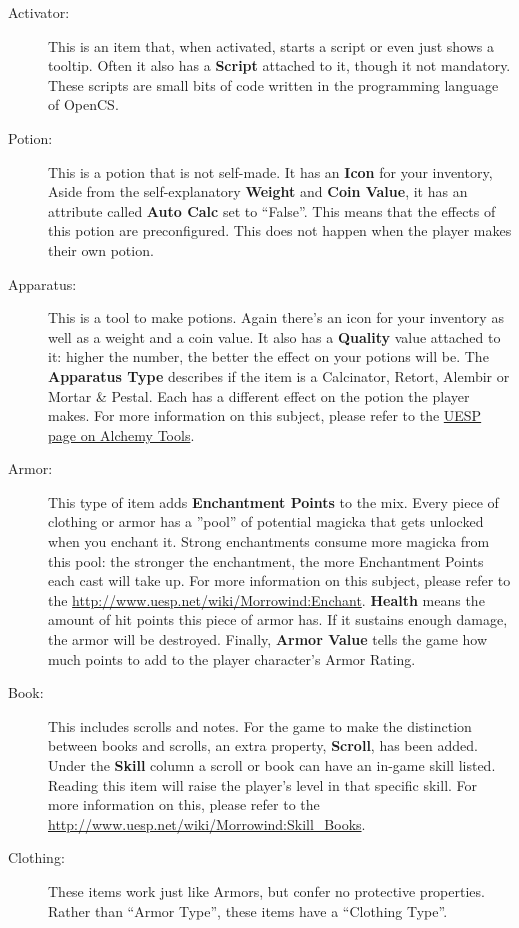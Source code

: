 \begin{description}
 \item[Activator:] This is an item that, when activated, starts a script or even just shows a tooltip. Often it also has a \textbf{Script} attached to it, though it not mandatory. These scripts are small bits of code written in the programming language of OpenCS.
 \item[Potion:] This is a potion that is not self-made. It has an \textbf{Icon} for your inventory, Aside from the self-explanatory \textbf{Weight} and \textbf{Coin Value}, it has an attribute called \textbf{Auto Calc} set to ``False''. This means that the effects of this potion are preconfigured. This does not happen when the player makes their own potion.
 \item[Apparatus:] This is a tool to make potions. Again there's an icon for your inventory as well as a weight and a coin value. It also has a \textbf{Quality} value attached to it: higher the number, the better the effect on your potions will be. The \textbf{Apparatus Type} describes if the item is a Calcinator, Retort, Alembir or Mortar & Pestal. Each has a different effect on the potion the player makes. For more information on this subject, please refer to the \href{http://www.uesp.net/wiki/Morrowind:Alchemy#Tools}{UESP page on Alchemy Tools}.
 \item[Armor:] This type of item adds \textbf{Enchantment Points} to the mix. Every piece of clothing or armor has a ''pool'' of potential magicka that gets unlocked when you enchant it. Strong enchantments consume more magicka from this pool: the stronger the enchantment, the more Enchantment Points each cast will take up. For more information on this subject, please refer to the \href{Enchant page on UESP}{http://www.uesp.net/wiki/Morrowind:Enchant}. \textbf{Health} means the amount of hit points this piece of armor has. If it sustains enough damage, the armor will be destroyed. Finally, \textbf{Armor Value} tells the game how much points to add to the player character's Armor Rating.
 \item[Book:] This includes scrolls and notes. For the game to make the distinction between books and scrolls, an extra property, \textbf{Scroll}, has been added. Under the \textbf{Skill} column a scroll or book can have an in-game skill listed. Reading this item will raise the player's level in that specific skill. For more information on this, please refer to the \href{Skill Books page on UESP}{http://www.uesp.net/wiki/Morrowind:Skill_Books}.
 \item[Clothing:] These items work just like Armors, but confer no protective properties. Rather than ``Armor Type'', these items have a ``Clothing Type''.

\end{description}
